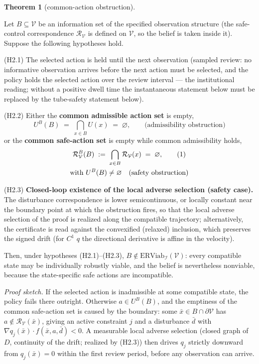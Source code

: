 \documentclass[10pt,twocolumn]{article}
\theoremstyle{definition}
\newtheorem{theorem}{Theorem}
\begin{document}
\begin{theorem}[common-action obstruction]\label{thm:common-action}

Let \(B \subseteq \mathcal{V}\) be an information set of the specified observation structure (the safe-control correspondence
\(\mathcal{R}_{\mathcal{V}}\) is defined on \(\mathcal{V}\), so the
belief is taken inside it). Suppose the following hypotheses hold.

(H2.1) The selected action is held until the next observation (sampled
review: no informative observation arrives before the next action must
be selected, and the policy holds the selected action over the review
interval --- the institutional reading; without a positive dwell time
the instantaneous statement below must be replaced by the tube-safety statement below).

(H2.2) Either the \textbf{common admissible action set} is empty,
\[U^B(B) \;=\; \bigcap_{x \in B} U(x) \;=\; \varnothing, \qquad \text{(admissibility obstruction)}\]
or the \textbf{common safe-action set} is empty while common
admissibility holds,
\begin{gather}
\mathcal{R}_{\mathcal{V}}^B(B) \;:=\; \bigcap_{x \in B} \mathcal{R}_{\mathcal{V}}(x) \;=\; \varnothing, \tag{1}\\
\text{with } U^B(B) \neq \varnothing \quad \text{(safety obstruction)} \notag
\end{gather}

(H2.3) \textbf{Closed-loop existence of the local adverse selection
(safety case).} The disturbance correspondence is lower semicontinuous,
or locally constant near the boundary point at which the obstruction
fires, so that the local adverse selection of the proof is realized
along the compatible trajectory; alternatively, the certificate is read
against the convexified (relaxed) inclusion, which preserves the
signed drift (for \(C^1\) \(q\) the directional derivative is affine in the velocity).

Then, under hypotheses (H2.1)--(H2.3),
\(B \notin \mathrm{ERViab}_{\mathcal{I}}(\mathcal{V})\): every
compatible state may be individually robustly viable, and the belief is
nevertheless nonviable, because the state-specific safe actions are
incompatible.

\end{theorem}

\emph{Proof sketch.} If the selected action is inadmissible at some compatible state, the policy fails there outright. Otherwise \(a \in U^B(B)\), and the emptiness of the common safe-action set is caused by the boundary: some \(\bar x \in B \cap \partial\mathcal{V}\) has \(a \notin \mathcal{R}_{\mathcal{V}}(\bar x)\), giving an active constraint \(j\) and a disturbance \(\bar d\) with \(\nabla q_j(\bar x) \cdot f(\bar x, a, \bar d) < 0\). A measurable local adverse selection (closed graph of \(D\), continuity of the drift; realized by (H2.3)) then drives \(q_j\) strictly downward from \(q_j(\bar x) = 0\) within the first review period, before any observation can arrive.
\end{document}
